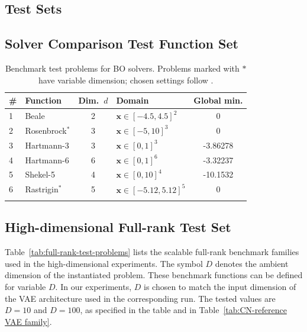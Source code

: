 \documentclass[pdflatex,sn-mathphys-num]{sn-jnl}%
\theoremstyle{thmstyleone}%
\theoremstyle{thmstyletwo}%
\theoremstyle{thmstylethree}%
\begin{document}


\newpage

\begin{appendices}

\section{Test Sets}\label{appendix: test sets}
\subsection{Solver Comparison Test Function Set}
\begin{table}[h]
\caption{Benchmark test problems for BO solvers. Problems marked with $\ast$ have variable dimension; chosen settings follow \cite{Cartis_2021,cartis2021globaloptimizationusingrandom}.}
\label{tab:solver-test}
\centering
\begin{tabular}{@{}l l c l c@{}}
\toprule
\# & Function & Dim.\ $d$ & Domain & {Global min.} \\
\midrule
1 & Beale \cite{Ernesto2005} & 2 & $\mathbf{x}\in[-4.5,4.5]^2$   & 0 \\
2 & Rosenbrock$^{\ast}$ \cite{Surjanovic2013} & 3 & $\mathbf{x}\in[-5,10]^3$     & 0 \\
3 & Hartmann-3 \cite{Ernesto2005} & 3 & $\mathbf{x}\in[0,1]^3$        & -3.86278 \\
4 & Hartmann-6 \cite{Ernesto2005} & 6 & $\mathbf{x}\in[0,1]^6$        & -3.32237 \\
5 & Shekel-5 \cite{Surjanovic2013} & 4 & $\mathbf{x}\in[0,10]^4$       & -10.1532 \\
6 & Rastrigin$^{\ast}$ \cite{Surjanovic2013} & 5 & $\mathbf{x}\in[-5.12,5.12]^5$ & 0 \\
\botrule
\end{tabular}
\end{table}
\FloatBarrier
\subsection{High-dimensional Full-rank Test Set}
Table~\ref{tab:full-rank-test-problems} lists the scalable full-rank benchmark families used in the high-dimensional experiments. The symbol \(D\) denotes the ambient dimension of the instantiated problem. These benchmark functions can be defined for variable \(D\). In our experiments, \(D\) is chosen to match the input dimension of the VAE architecture used in the corresponding run. The tested values are \(D=10\) and \(D=100\), as specified in the table and in Table~\ref{tab:CN-reference VAE family}.


\end{appendices}
\end{document}
